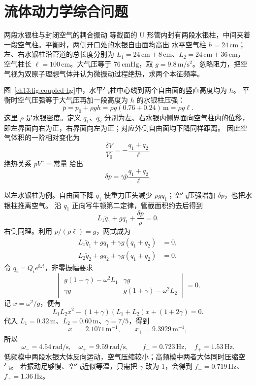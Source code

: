 \section{流体动力学综合问题}\label{ch13:sec:problems}

\begin{origexamplebox}{两段水银柱与封闭空气的耦合振动}\label{ch13:ex:coupled-hg}
等截面的 U 形管内封有两段水银柱，中间夹着一段空气柱。平衡时，两侧开口处的水银自由面均高出
水平空气柱 $h=24\,\mathrm{cm}$；左、右水银柱沿管道的总长度分别为
$L_1=24\,\mathrm{cm}+8\,\mathrm{cm}$、$L_2=24\,\mathrm{cm}+36\,\mathrm{cm}$，
空气柱长 $\ell=100\,\mathrm{cm}$。大气压等于 $76\,\mathrm{cmHg}$，取
$g=9.8\,\mathrm{m/s^2}$。忽略阻力，把空气视为双原子理想气体并认为微振动过程绝热，求两个本征频率。

\FluidCoupledHgDiagram
\end{origexamplebox}
\begin{xesolution}
\ThACoupledMercury

图~\ref{ch13:fig:coupled-hg}中，水平气柱中心线到两个自由面的竖直高度均为 $h$。
平衡时空气压强等于大气压再加一段高度为 $h$ 的水银柱压强：
\[
 \bar p=p_0+\rho gh=\rho g(0.76+0.24)\,\mathrm m=\rho g\ell .
\]
这里 $\rho$ 是水银密度。定义 $q_1$、$q_2$ 分别为左、右水银内侧界面向空气柱内的位移，
即左界面向右为正，右界面向左为正；对应外侧自由面均下降同样距离。
因此空气体积的一阶相对变化为
\[
 \frac{\delta V}{V_0}=-\frac{q_1+q_2}{\ell}.
\]
绝热关系 $pV^\gamma=\text{常量}$ 给出
\[
 \delta p=\gamma\bar p\frac{q_1+q_2}{\ell}.
\]

以左水银柱为例。自由面下降 $q_1$ 使重力压头减少 $\rho gq_1$；空气压强增加 $\delta p$，也把水银柱推离空气。
沿 $q_1$ 正向写牛顿第二定律，管截面积约去后得到
\[
 L_1\ddot q_1+gq_1+\frac{\delta p}{\rho}=0.
\]
右侧同理。利用 $\bar p/(\rho\ell)=g$，两式成为
\begin{align*}
 L_1\ddot q_1+gq_1+\gamma g(q_1+q_2)&=0,\\
 L_2\ddot q_2+gq_2+\gamma g(q_1+q_2)&=0.
\end{align*}
令 $q_i=Q_i e^{\ii\omega t}$，非零振幅要求
\[
 \begin{vmatrix}
 g(1+\gamma)-\omega^2L_1&\gamma g\\
 \gamma g&g(1+\gamma)-\omega^2L_2
 \end{vmatrix}=0.
\]
记 $x=\omega^2/g$，便有
\[
 L_1L_2x^2-(1+\gamma)(L_1+L_2)x+(1+2\gamma)=0.
\]
代入 $L_1=0.32\,\mathrm m$、$L_2=0.60\,\mathrm m$、$\gamma=7/5$，得到
\[
 x_-=2.1071\,\mathrm{m^{-1}},\qquad x_+=9.3929\,\mathrm{m^{-1}},
\]
所以
\[
 \boxed{\omega_-=4.54\,\mathrm{rad/s},\quad \omega_+=9.59\,\mathrm{rad/s}},
 \qquad
 \boxed{f_-=0.723\,\mathrm{Hz},\quad f_+=1.53\,\mathrm{Hz}}.
\]
低频模中两段水银大体反向运动，空气压缩较小；高频模中两者大体同时压缩空气。
若振动足够慢、空气近似等温，只需把 $\gamma$ 改为 $1$，会得到
$f_-=0.719\,\mathrm{Hz}$、$f_+=1.36\,\mathrm{Hz}$。
\end{xesolution}

